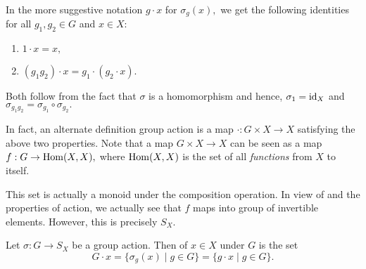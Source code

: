 \begin{rem}
	In the more suggestive notation $g \cdot x$ for $\sigma_g(x),$ we get the following identities for all $g_1, g_2 \in G$ and $x \in X$:
	\begin{enumerate}
		\item $1 \cdot x = x,$
		\item $(g_1g_2) \cdot x = g_1 \cdot (g_2 \cdot x).$
	\end{enumerate}
	Both follow from the fact that $\sigma$ is a homomorphism and hence, $\sigma_1 = \operatorname{id}_X$ and $\sigma_{g_1g_2} = \sigma_{g_1} \circ \sigma_{g_2}.$
\end{rem}

\begin{rem}
	In fact, an alternate definition group action is a map $\cdot : G \times X \to X$ satisfying the above two properties. Note that a map $G \times X \to X$ can be seen as a map $f : G \to \operatorname{Hom}(X, X),$ where $\operatorname{Hom}(X, X)$ is the set of all \emph{functions} from $X$ to itself.

	This set is actually a monoid under the composition operation. In view of  and the properties of action, we actually see that $f$ maps into group of invertible elements. However, this is precisely $S_X.$
\end{rem}


\begin{defn}%
	Let $\sigma : G \to S_X$ be a group action. Then  of $x \in X$ under $G$ is the set
	\begin{equation*} 
		G \cdot x = \{\sigma_g(x) \mid g \in G\} = \{g \cdot x \mid g \in G\}.
	\end{equation*}
\end{defn}

